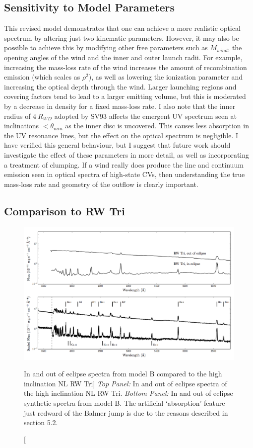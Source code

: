 \subsection{Sensitivity to Model Parameters}
\label{sec:cv_params}
This revised model demonstrates that one can achieve a more
realistic optical spectrum by altering just two kinematic parameters. 
However, it may also be possible to achieve this by modifying
other free parameters such as $\dot{M}_{wind}$, the opening angles of the wind and the 
inner and outer launch radii. For example, increasing the mass-loss rate of the wind
increases the amount of recombination emission (which scales as $\rho^2$), 
as well as lowering the ionization parameter and increasing the optical depth through the wind. 
Larger launching regions and covering factors tend to lead to a larger emitting volume, 
but this is moderated by a decrease in density 
for a fixed mass-loss rate. I also note that the inner radius of $4~R_{WD}$ adopted by SV93 
affects the emergent UV spectrum seen at inclinations $<\theta_{min}$ as 
the inner disc is uncovered. This causes less absorption in the UV resonance lines,
but the effect on the optical spectrum is negligible.
I have verified this general behaviour, but
I suggest that future work should investigate the effect of these parameters in more detail,
as well as incorporating a treatment of clumping.
If a wind really does produce the line and continuum emission seen in optical spectra of high-state CVs, then
understanding the true mass-loss rate and geometry of the outflow is clearly important.


\subsection{Comparison to RW Tri}
\label{sec:rwtri}
\begin{figure}
\includegraphics[width=0.9\textheight, angle=270]{figures/05-cvpaper/fig13.png}
\caption
[In and out of eclipse spectra from model B compared to the high
inclination NL RW Tri]
{{\sl Top Panel:} In and out of eclipse spectra of the high
inclination NL RW Tri. {\sl Bottom Panel:} In and out of eclipse synthetic
spectra from model B.
The artificial `absorption' feature just redward of the Balmer jump
is due to the reasons described in section 5.2.}
\label{rwtricomp}
\end{figure}

